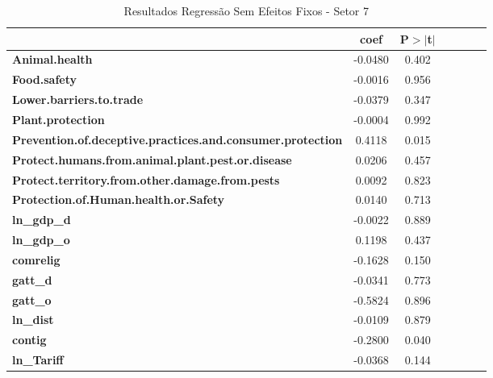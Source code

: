 \begin{table}[ht]
\begin{center}
\begin{tabular}{lcccccc}
& \textbf{coef} & \textbf{P$> |$t$|$} \\
\midrule
\textbf{Animal.health}                                             &      -0.0480 &   0.402  \\
\textbf{Food.safety}                                               &      -0.0016 &   0.956  \\
\textbf{Lower.barriers.to.trade}                                   &      -0.0379 &   0.347  \\
\textbf{Plant.protection}                                          &      -0.0004 &   0.992  \\
\textbf{Prevention.of.deceptive.practices.and.consumer.protection} &       0.4118 &   0.015  \\
\textbf{Protect.humans.from.animal.plant.pest.or.disease}          &       0.0206 &   0.457  \\
\textbf{Protect.territory.from.other.damage.from.pests}            &       0.0092 &   0.823  \\
\textbf{Protection.of.Human.health.or.Safety}                      &       0.0140 &   0.713  \\
\textbf{ln\_gdp\_d}                                                &      -0.0022 &   0.889  \\
\textbf{ln\_gdp\_o}                                                &       0.1198 &   0.437  \\
\textbf{comrelig}                                                  &      -0.1628 &   0.150  \\
\textbf{gatt\_d}                                                   &      -0.0341 &   0.773  \\
\textbf{gatt\_o}                                                   &      -0.5824 &   0.896  \\
\textbf{ln\_dist}                                                  &      -0.0109 &   0.879  \\
\textbf{contig}                                                    &      -0.2800 &   0.040  \\
\textbf{ln\_Tariff}                                                &      -0.0368 &   0.144  \\
\bottomrule
\end{tabular}
\caption{Resultados Regressão Sem Efeitos Fixos - Setor 7}
\end{center}
\end{table}